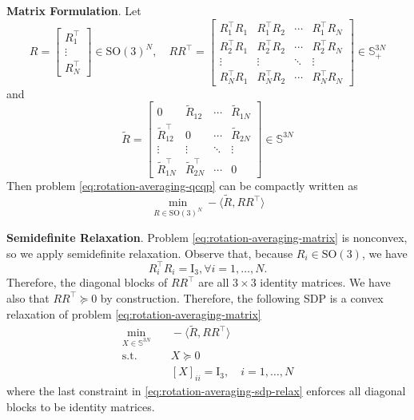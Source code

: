 \documentclass[
]{book}
\theoremstyle{definition}
\theoremstyle{definition}
\theoremstyle{definition}
\theoremstyle{definition}
\theoremstyle{remark}
\begin{document}
\textbf{Matrix Formulation}. Let
\[
R = \begin{bmatrix} 
R_1^\top\\
\vdots \\
R_N^\top
\end{bmatrix} \in \mathrm{SO}(3)^N,\quad 
RR^\top= \begin{bmatrix}
R_1^\top R_1 & R_1^\top R_2 & \cdots & R_1^\top R_N \\
R_2^\top R_1 & R_2^\top R_2 & \cdots & R_2^\top R_N \\
\vdots & \vdots & \ddots & \vdots \\
R_N^\top R_1 & R_N^\top R_2 & \cdots & R_N^\top R_N
\end{bmatrix} \in \mathbb{S}^{3N}_{+}
\]
and
\begin{equation}
\tilde{R}= \begin{bmatrix}
0 & \tilde{R}_{12} & \cdots & \tilde{R}_{1N} \\
\tilde{R}_{12}^\top& 0 & \cdots & \tilde{R}_{2N}\\
\vdots & \vdots & \ddots & \vdots \\
\tilde{R}_{1N}^\top& \tilde{R}_{2N}^\top& \cdots & 0
\end{bmatrix} \in \mathbb{S}^{3N}
\label{eq:rotation-averaging-tldR}
\end{equation}
Then problem \eqref{eq:rotation-averaging-qcqp} can be compactly written as
\begin{equation}
\min_{R \in \mathrm{SO}(3)^N} - \langle \tilde{R}, RR^\top \rangle
\label{eq:rotation-averaging-matrix}
\end{equation}

\textbf{Semidefinite Relaxation}. Problem \eqref{eq:rotation-averaging-matrix} is nonconvex, so we apply semidefinite relaxation. Observe that, because \(R_i \in \mathrm{SO}(3)\), we have
\[
R_i^\top R_i = \mathrm{I}_3, \forall i=1,\dots,N.
\]
Therefore, the diagonal blocks of \(RR^\top\) are all \(3\times 3\) identity matrices. We have also that \(RR^\top\succeq 0\) by construction. Therefore, the following SDP is a convex relaxation of problem \eqref{eq:rotation-averaging-matrix}
\begin{equation}
\begin{split}
\min_{X \in \mathbb{S}^{3N}} & \quad - \langle \tilde{R}, RR^\top \rangle \\
\mathrm{s.t.}& \quad X \succeq 0 \\
& \quad [X]_{ii} = \mathrm{I}_3, \quad i=1,\dots,N
\end{split}
\label{eq:rotation-averaging-sdp-relax}
\end{equation}
where the last constraint in \eqref{eq:rotation-averaging-sdp-relax} enforces all diagonal blocks to be identity matrices.
\end{document}
